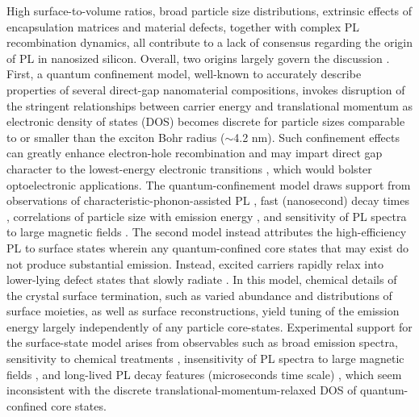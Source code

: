 High surface-to-volume ratios, broad particle size distributions, extrinsic effects of encapsulation matrices and material defects, together with complex PL recombination dynamics, all contribute to a lack of consensus regarding the origin of PL in nanosized silicon. Overall, two origins largely govern the discussion \cite{saar2009PL}.  First, a quantum confinement model, well-known to accurately describe properties of several direct-gap nanomaterial compositions, invokes disruption of the stringent relationships between carrier energy and translational momentum as electronic density of states (DOS) becomes discrete for particle sizes comparable to or smaller than the exciton Bohr radius ($\sim$4.2 nm). Such confinement effects can greatly enhance electron-hole recombination and may impart direct gap character to the lowest-energy electronic transitions \cite{PhysRevLett.72.1514}, which would bolster optoelectronic applications. The quantum-confinement model draws support from observations of characteristic-phonon-assisted PL \cite{PhysRevLett.81.2803}, fast (nanosecond) decay times \cite{PhysRevLett.100.067401,english2002size,kusova2010brightly,groenewegen2010excited}, correlations of particle size with emission energy \cite{Wilson19111993,kovalev1999optical,english2002size,mastronardi2011preparation}, and sensitivity of PL spectra to large magnetic fields \cite{godefroo2008classification}.  The second model instead attributes the high-efficiency PL to surface states wherein any quantum-confined core states that may exist do not produce substantial emission. Instead, excited carriers rapidly relax into lower-lying defect states that slowly radiate \cite{PhysRevB.49.16845,PhysRevLett.88.097401,godefroo2008classification,PhysRevLett.100.067401,PhysRevLett.76.2961,PhysRevB.48.11024,PhysRevB.84.085321}. In this model, chemical details of the crystal surface termination, such as varied abundance and distributions of surface moieties, as well as surface reconstructions, yield tuning of the emission energy largely independently of any particle core-states. Experimental support for the surface-state model arises from observables such as broad emission spectra, sensitivity to chemical treatments \cite{PhysRevLett.82.197}, insensitivity of PL spectra to large magnetic fields \cite{godefroo2008classification}, and long-lived PL decay features (microseconds time scale) \cite{PhysRevLett.100.067401,PhysRevLett.82.197,vzidek2010femtosecond}, which seem inconsistent with the discrete translational-momentum-relaxed DOS of quantum-confined core states. \par


